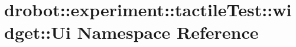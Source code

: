 \hypertarget{namespacedrobot_1_1experiment_1_1tactileTest_1_1widget_1_1Ui}{\section{drobot\-:\-:experiment\-:\-:tactile\-Test\-:\-:widget\-:\-:Ui Namespace Reference}
\label{namespacedrobot_1_1experiment_1_1tactileTest_1_1widget_1_1Ui}
}
